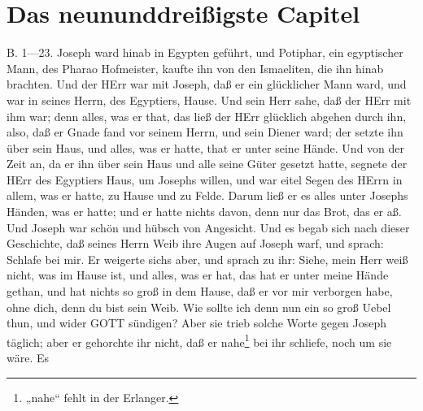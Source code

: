 \section{Das neununddreißigste Capitel}

B. 1—23. Joseph ward hinab in Egypten geführt, und Potiphar, ein egyptischer Mann, des Pharao Hofmeister, kaufte ihn von den Ismaeliten, die ihn hinab brachten. Und der HErr war mit Joseph, daß er ein glücklicher Mann ward, und war in seines Herrn, des Egyptiers, Hause. Und sein Herr sahe, daß der HErr mit ihm war; denn alles, was er that, das ließ der HErr glücklich abgehen durch ihn, also, daß er Gnade fand vor seinem Herrn, und sein Diener ward; der setzte ihn über sein Haus, und alles, was er hatte, that er unter seine Hände. Und von der Zeit an, da er ihn über sein Haus und alle seine Güter gesetzt hatte, segnete der HErr des Egyptiers Haus, um Josephs willen, und war eitel Segen des HErrn in allem, was er hatte, zu Hause und zu Felde. Darum ließ er es alles unter Josephs Händen, was er hatte; und er hatte nichts davon, denn nur das Brot, das er aß. Und Joseph war schön und hübsch von Angesicht. Und es begab sich nach dieser Geschichte, daß seines Herrn Weib ihre Augen auf Joseph warf, und sprach: Schlafe bei mir. Er weigerte sichs aber, und sprach zu ihr: Siehe, mein Herr weiß nicht, was im Hause ist, und alles, was er hat, das hat er unter meine Hände gethan, und hat nichts so groß in dem Hause, daß er vor mir verborgen habe, ohne dich, denn du bist sein Weib. Wie sollte ich denn nun ein so groß Uebel thun, und wider GOTT sündigen? Aber sie trieb solche Worte gegen Joseph täglich; aber er gehorchte ihr nicht, daß er nahe\footnote{„nahe“ fehlt in der Erlanger.} bei ihr schliefe, noch um sie wäre. Es
